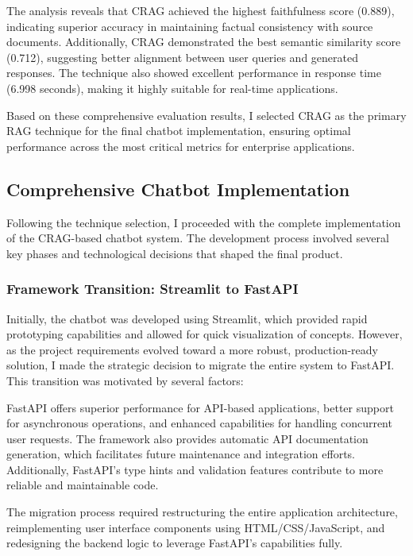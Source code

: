 \documentclass[12pt,a4paper]{article}
\begin{document}
The analysis reveals that CRAG achieved the highest faithfulness score (0.889), indicating superior accuracy in maintaining factual consistency with source documents. Additionally, CRAG demonstrated the best semantic similarity score (0.712), suggesting better alignment between user queries and generated responses. The technique also showed excellent performance in response time (6.998 seconds), making it highly suitable for real-time applications.

Based on these comprehensive evaluation results, I selected CRAG as the primary RAG technique for the final chatbot implementation, ensuring optimal performance across the most critical metrics for enterprise applications.

\subsection{Comprehensive Chatbot Implementation}

Following the technique selection, I proceeded with the complete implementation of the CRAG-based chatbot system. The development process involved several key phases and technological decisions that shaped the final product.

\subsubsection{Framework Transition: Streamlit to FastAPI}

Initially, the chatbot was developed using Streamlit, which provided rapid prototyping capabilities and allowed for quick visualization of concepts. However, as the project requirements evolved toward a more robust, production-ready solution, I made the strategic decision to migrate the entire system to FastAPI. This transition was motivated by several factors:

FastAPI offers superior performance for API-based applications, better support for asynchronous operations, and enhanced capabilities for handling concurrent user requests. The framework also provides automatic API documentation generation, which facilitates future maintenance and integration efforts. Additionally, FastAPI's type hints and validation features contribute to more reliable and maintainable code.

The migration process required restructuring the entire application architecture, reimplementing user interface components using HTML/CSS/JavaScript, and redesigning the backend logic to leverage FastAPI's capabilities fully.
\end{document}
